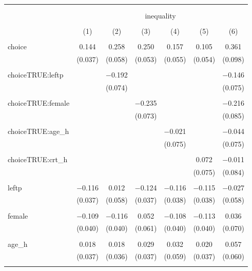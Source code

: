 
\begin{table}[!htbp] \centering 
  \caption{} 
  \label{} 
\begin{tabular}{@{\extracolsep{5pt}}lcccccc} 
\\[-1.8ex]\hline 
\hline \\[-1.8ex] 
\\[-1.8ex] & \multicolumn{6}{c}{inequality} \\ 
\\[-1.8ex] & (1) & (2) & (3) & (4) & (5) & (6)\\ 
\hline \\[-1.8ex] 
 choice & 0.144 & 0.258 & 0.250 & 0.157 & 0.105 & 0.361 \\ 
  & (0.037) & (0.058) & (0.053) & (0.055) & (0.054) & (0.098) \\ 
  & & & & & & \\ 
 choiceTRUE:leftp &  & $-$0.192 &  &  &  & $-$0.146 \\ 
  &  & (0.074) &  &  &  & (0.075) \\ 
  & & & & & & \\ 
 choiceTRUE:female &  &  & $-$0.235 &  &  & $-$0.216 \\ 
  &  &  & (0.073) &  &  & (0.085) \\ 
  & & & & & & \\ 
 choiceTRUE:age\_h &  &  &  & $-$0.021 &  & $-$0.044 \\ 
  &  &  &  & (0.075) &  & (0.075) \\ 
  & & & & & & \\ 
 choiceTRUE:crt\_h &  &  &  &  & 0.072 & $-$0.011 \\ 
  &  &  &  &  & (0.075) & (0.084) \\ 
  & & & & & & \\ 
 leftp & $-$0.116 & 0.012 & $-$0.124 & $-$0.116 & $-$0.115 & $-$0.027 \\ 
  & (0.037) & (0.058) & (0.037) & (0.038) & (0.038) & (0.058) \\ 
  & & & & & & \\ 
 female & $-$0.109 & $-$0.116 & 0.052 & $-$0.108 & $-$0.113 & 0.036 \\ 
  & (0.040) & (0.040) & (0.061) & (0.040) & (0.040) & (0.070) \\ 
  & & & & & & \\ 
 age\_h & 0.018 & 0.018 & 0.029 & 0.032 & 0.020 & 0.057 \\ 
  & (0.037) & (0.036) & (0.037) & (0.059) & (0.037) & (0.060) \\ 
  & & & & & & \\ 

\end{tabular}
\end{table}
